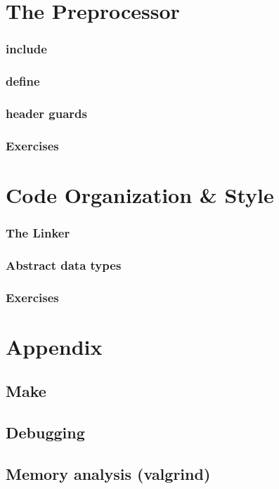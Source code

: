 \documentclass[ebook,11pt,oneside,openany]{memoir}
\begin{document}

\chapter{The Preprocessor}
\label{ch:pre}
\subsection{include}
\subsection{define}
\subsection{header guards}
\subsection{Exercises}

\chapter{Code Organization \& Style}
\label{ch:org}
\subsection{The Linker}
\subsection{Abstract data types}
\subsection{Exercises}

\chapter{Appendix}
\section{Make}
\section{Debugging}
\section{Memory analysis (valgrind)}
\end{document}
